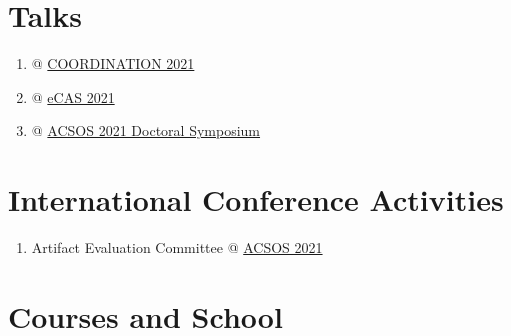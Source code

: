 \documentclass[12pt]{article}
\begin{document}
\section{Talks}
\begin{enumerate}
	\item {} @ \href{https://www.discotec.org/2021/programme}{COORDINATION 2021}
	\item {} @ \href{https://apice.unibo.it/xwiki/bin/view/ECAS2021/Program}{eCAS 2021}
	\item {} @ \href{https://conf.researchr.org/program/acsos-2021/program-acsos-2021/?date=Fri%201%20Oct%202021}{ACSOS 2021 Doctoral Symposium}
\end{enumerate}
\section{International Conference Activities}
\begin{enumerate}
	\item Artifact Evaluation Committee @ \href{https://conf.researchr.org/committee/acsos-2021/acsos-2021-papers-artifact-evaluation-committee}{ACSOS 2021}

\end{enumerate}
\section{Courses and School}
\end{document}
